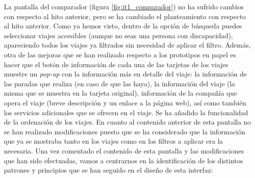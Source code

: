 La pantalla del comparador (figura \ref{fig:it1_comparador}) no ha sufrido cambios con respecto al hito anterior, pero se ha cambiado el planteamiento
con respecto al hito anterior. Como ya hemos visto, dentro de la opción de búsqueda puedes seleccionar viajes
accesibles (aunque no seas una persona con discapacidad), apareciendo todos los viajes ya filtrados sin necesidad
de aplicar el filtro. Además, otra de las mejoras que se han realizado respecto a los prototipos en papel es hacer
que el botón de información de cada una de las tarjetas de los viajes muestre un \textit{pop-up} con la información más en
detalle del viaje: la información de las paradas que realiza (en caso de que las haya), la información del viaje
(la misma que se muestra en la tarjeta original), información de la compañía que opera el viaje (breve descripción
y un enlace a la página web), así como también los servicios adicionales que se ofrecen en el viaje. Se ha añadido
la funcionalidad de la ordenación de los viajes. En cuanto al contenido anterior de esta pantalla no se han realizado
modificaciones puesto que se ha considerado que la información que ya se mostraba tanto en los viajes como en los
filtros a aplicar era la necesaria. Una vez comentado el contenido de esta pantalla y las modificaciones que han
sido efectuadas, vamos a centrarnos en la identificación de los distintos patrones y principios que se han seguido
en el diseño de esta interfaz:

